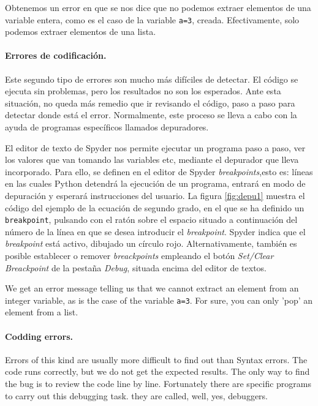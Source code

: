 \begin{paracol}{2}
Obtenemos un error en que se nos dice que no podemos extraer elementos de una variable entera, como es el caso de la variable \texttt{a=3}, creada. Efectivamente, solo podemos extraer elementos de una lista.

\paragraph{Errores de codificación.} Este segundo tipo de errores son mucho más difíciles de detectar. El código se ejecuta sin problemas, pero los resultados no son los esperados. Ante esta situación, no queda más remedio que ir revisando el código, paso a paso para detectar donde está el error. Normalmente, este proceso se lleva a cabo con la ayuda de programas específicos llamados depuradores.

El editor de texto de Spyder nos permite ejecutar un programa paso a paso, ver los valores que van tomando las variables etc, mediante el depurador que lleva incorporado. Para ello, se definen en el editor de Spyder \emph{breakpoints},esto es: líneas en las cuales Python detendrá la ejecución de un programa, entrará en modo de depuración y esperará instrucciones del usuario. La figura \ref{fig:depu1} muestra el código del ejemplo de la ecuación de segundo grado, en el que se ha definido un \texttt{breakpoint}, pulsando con el ratón sobre el espacio situado a continuación del número de la línea en que se desea  introducir el \emph{breakpoint}.  Spyder indica que el \emph{breakpoint} está activo, dibujado un círculo rojo. Alternativamente, también es posible establecer o remover \emph{breackpoints} empleando el botón \emph{Set/Clear Breackpoint} de la pestaña \emph{Debug}, situada encima del editor de textos.

\switchcolumn
We get an error message telling us that we cannot extract an element from an integer variable, as is the case of the variable \texttt{a=3}. For sure, you can only 'pop' an element from a list.

\paragraph{Codding errors.} Errors of this kind are usu\-ally more difficult to find out than Syntax errors. The code runs correctly, but we do not get the expected results. The only way to find the bug is to review the code line by line. Fortunately there are specific programs to carry out this debugging task. they are called, well, yes, debuggers.


\end{paracol}
